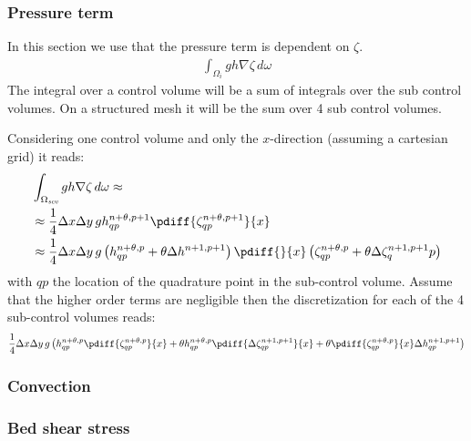 \subsubsection{Pressure term} \label{sec:linearized_pressure_zeta}
In this section we use that the pressure term is dependent on $\zeta$.
\begin{align}
    \int_{\Omega_i} gh \nabla \zeta \, d\omega
\end{align}
The integral over a control volume will be a sum of integrals over the sub control volumes.
On a structured mesh it will be the sum over 4 sub control volumes.

Considering one control volume and only the $x$-direction (assuming a cartesian grid) it reads:
\begin{align}
    & \int_{\Omega_{\textit{scv}}} gh \nabla \zeta \, d\omega  \approx
    \\
    & \approx \quart \Dx\Dy\, g h^{n+\theta,p+1}_{qp} \pdiff{\zeta^{n+\theta,p+1}_{qp}}{x}
    \\
   & \approx \quart  \Dx\Dy\, g \left( h^{n+\theta,p}_{qp} + \theta \Delta h^{n+1,p+1}\right)  \pdiff{}{x}\left(\zeta^{n+\theta,p}_{qp} + \theta \Delta \zeta^{n+1,p+1}_qp\right)
\end{align}
with $qp$ the location of the quadrature point in the sub-control volume.
Assume that the higher order terms are negligible then the discretization for each of the 4 sub-control volumes reads:
\begin{align}
        \quart  \Dx\Dy\, g \left(
        h^{n+\theta,p}_{qp} \pdiff{\zeta^{n+\theta,p}_{qp}}{x}
        + \theta h^{n+\theta,p}_{qp} \pdiff{\Delta \zeta^{n+1,p+1}_{qp}}{x}
        + \theta \pdiff{\zeta^{n+\theta,p}_{qp}}{x} \Delta h^{n+1,p+1}_{qp}
          \right)
\end{align}

\subsubsection{Convection}
\notyet

\subsubsection{Bed shear stress}
\notyet

